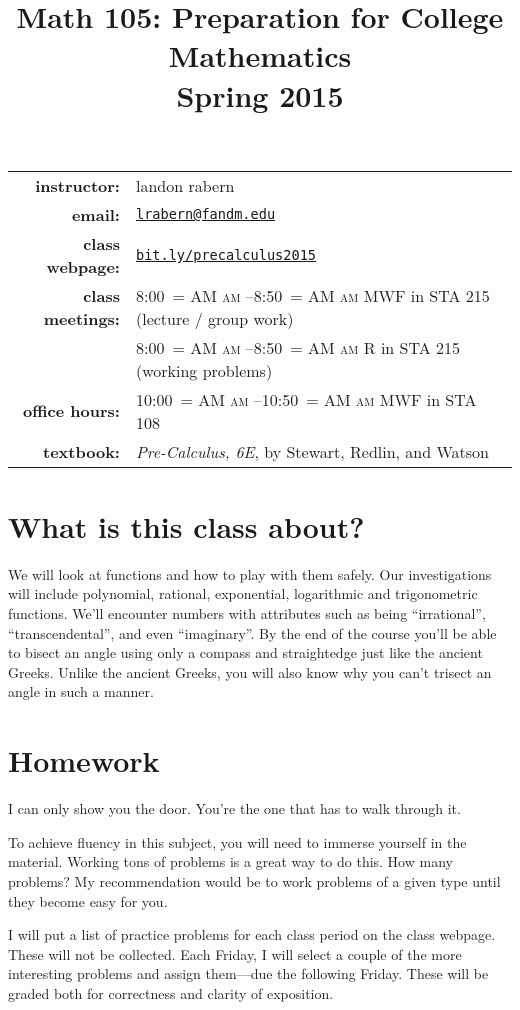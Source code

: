 \documentclass[12pt]{article}
\title{Math 105: Preparation for College Mathematics\\ \bigskip\small{Spring 2015}}
\date{}
\makeatletter
\DeclareRobustCommand{\maybefakesc}[1]{%
  \ifnum\pdfstrcmp{\f@series}{\bfdefault}=\z@
    {\fontsize{\dimexpr0.8\dimexpr\f@size pt\relax}{0}\selectfont\uppercase{#1}}%
  \else
    \textsc{#1}%
  \fi
}
\newcommand\AM{\,\maybefakesc{am}\xspace}
\makeatother
\begin{document}
\maketitle

\begin{tabular}{r l}
\textbf{instructor:}& landon rabern\\
\textbf{email:}& \href{mailto:lrabern@fandm.edu}{\nolinkurl{lrabern@fandm.edu}}\\
\textbf{class webpage:}& \href{http://bit.ly/precalculus2015}{\nolinkurl{bit.ly/precalculus2015}}\\
\textbf{class meetings:}& 8:00\AM--8:50\AM MWF in STA 215 (lecture / group work)\\
& 8:00\AM--8:50\AM R in STA 215 (working problems)\\
\textbf{office hours:}& 10:00\AM--10:50\AM MWF in STA 108\\
\textbf{textbook:}& \textit{Pre-Calculus, 6E}, by Stewart, Redlin, and Watson\\
\end{tabular}

\section*{What is this class about?}
We will look at functions and how to play with them safely.  Our investigations will include polynomial, rational, exponential, logarithmic and trigonometric functions.  We'll encounter numbers with attributes such as being ``irrational'', ``transcendental'', and even ``imaginary''.  By the end of the course you'll be able to bisect an angle using only a compass and straightedge just like the ancient Greeks.  Unlike the ancient Greeks, you will also know why you can't trisect an angle in such a manner.

\section*{Homework} 
\epigraph{I can only show you the door. You're the one that has to walk through it.}{}
To achieve fluency in this subject, you will need to immerse yourself in the material.  
Working tons of problems is a great way to do this.  How many problems?  
My recommendation would be to work problems of a given type until they become easy for you.

I will put a list of practice problems for each class period on the class webpage.  These will not be collected.  
Each Friday, I will select a couple of the more interesting problems and assign them---due the following Friday.
These will be graded both for correctness and clarity of exposition.
\end{document}
